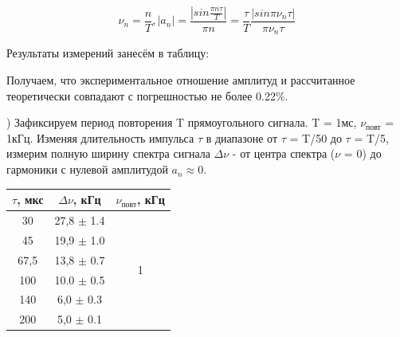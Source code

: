 \documentclass[a4paper,12pt]{article}
\begin{document}
$$ \nu_n = \frac{n}{T},     |a_n| = \frac{|sin\frac{\pi n\tau}{T}|}{\pi n} = \frac{\tau}{T}\frac{|sin\pi\nu_n\tau|}{\pi\nu_n\tau} $$

Результаты измерений занесём в таблицу: 

\begin{center}
\end{center}

Получаем, что экспериментальное отношение амплитуд и рассчитанное теоретически совпадают с погрешностью не более 0.22\%.

) Зафиксируем период повторения T прямоугольного сигнала. T = 1мс, $\nu_{\text{повт}}$ = 1кГц. Изменяя длительность импульса $\tau$ в диапазоне от $\tau$ = T/50 до $\tau$ = T/5, измерим полную ширину спектра сигнала $\Delta\nu$ - от центра спектра ($\nu$ = 0) до гармоники с нулевой амплитудой $a_n\approx 0$.


\begin{center}
\begin{tabular}{|c|c|c|}
	\hline
	$\tau$, мкс & $\Delta\nu$, кГц & $\nu_{\text{повт}}$, кГц \\
	\hline
	30 & 27,8 $\pm$ 1.4  & \multirow{6}{*}{1}\\
	\cline{1-2} 45 & 19,9 $\pm$ 1.0 & \\
	\cline{1-2} 67,5 & 13,8 $\pm$ 0.7 & \\
	\cline{1-2} 100 & 10.0 $\pm$ 0.5 & \\
	\cline{1-2} 140 & 6,0 $\pm$ 0.3 & \\
	\cline{1-2} 200 & 5,0 $\pm$ 0.1 & \\
	\hline
\end{tabular}
\end{center}
\end{document}
